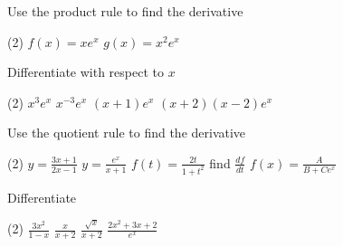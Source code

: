 \begin{Exercise}[title={Product, Quotient, \& Chain Rules},label=exPQCRules]
	\Question Use the product rule to find the derivative
	\begin{tasks}(2)
		\task  $f (x) =x e^{x}$ %
		\task $g (x) =x^{2} e^{x}$ %
	\end{tasks}
	
	\Question Differentiate with respect to $x$ 
	\begin{tasks}(2)
		\task $x^{3} e^{x}$ %
		\task $x^{ -3} e^{x}$ %
		\task $\left (x +1\right ) e^{x}$ %
		\task $\left (x +2\right ) \left (x -2\right ) e^{x}$ %
	\end{tasks}

	\Question Use the quotient rule to find the derivative
\begin{tasks}(2)
	\task  $y =\frac{3 x +1}{2 x -1}$ %
	\task $y =\frac{e^{x}}{x +1}$ %
	\task $f (t) =\frac{2 t}{1 +t^{2}}$ find $\frac{d f}{d t}$ %
	\task $f (x) =\frac{A}{B +C e^{x}}$ %
\end{tasks}

\Question Differentiate
\begin{tasks}(2)
	\task $\frac{3 x^{2}}{1 -x}$ %
	\task $\frac{x}{x +2}$ %
	\task $\frac{\sqrt{x}}{x +2}$ %
	\task $\frac{2 x^{2} +3 x +2}{e^{x}}$ %
		
\end{tasks}


\end{Exercise}
